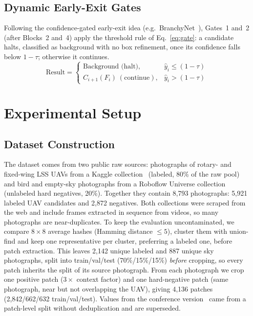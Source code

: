 \documentclass[pdflatex,sn-mathphys-num,iicol]{sn-jnl}%
\begin{document}
\subsection{Dynamic Early-Exit Gates}\label{sec:gates}
Following the confidence-gated early-exit idea
(e.g.\ BranchyNet~\cite{teerapittayanon2016branchynet}), Gates~1 and~2
(after Blocks~2 and~4) apply the threshold rule of Eq.~\ref{eq:gate}: a
candidate halts, classified as background with no box refinement, once
its confidence falls below $1-\tau$; otherwise it continues.
\begin{equation}
\text{Result} = \begin{cases}
\text{Background (halt)}, & \hat{y}_i \le (1-\tau) \\
C_{i+1}(F_i)\ (\text{continue}), & \hat{y}_i > (1-\tau)
\end{cases}
\label{eq:gate}
\end{equation}

\section{Experimental Setup}\label{sec:setup}

\subsection{Dataset Construction}\label{sec:leakage}

 The dataset comes from two public raw sources: photographs of rotary- and
fixed-wing LSS UAVs from a Kaggle collection~\cite{dasmehdixtr_kaggle}
(labeled, 80\% of the raw pool) and bird and empty-sky photographs from a
Roboflow Universe collection~\cite{mohsen_roboflow} (unlabeled hard
negatives, 20\%). Together they contain 8{,}793 photographs: 5{,}921
labeled UAV candidates and 2{,}872 negatives. Both collections were
scraped from the web and include frames extracted in sequence from videos,
so many photographs are near-duplicates. To keep the evaluation
uncontaminated, we compare $8\times8$ average hashes (Hamming distance
$\le 5$), cluster them with union-find and keep one representative per
cluster, preferring a labeled one, before patch extraction. This leaves 2{,}142
unique labeled and 887 unique sky photographs, split into train/val/test
(70\%/15\%/15\%) \emph{before} cropping, so every patch inherits the split of
its source photograph. From each photograph we crop one positive patch
($3\times$ context factor) and one hard-negative patch (same photograph, near
but not overlapping the UAV), giving 4{,}136 patches (2{,}842/662/632
train/val/test). Values from the conference version~\cite{aydin2026emadetconf}
came from a patch-level split without deduplication and are superseded.
\end{document}
